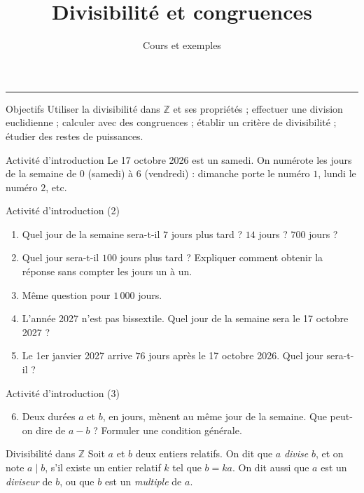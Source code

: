 \documentclass[aspectratio=169,10pt]{beamer}
\title{Divisibilité et congruences}
\subtitle{Cours et exemples}
\date{}
\author{}
\providecommand{\Z}{\mathbb{Z}}
\begin{document}
\begin{frame}[plain]
\vfill
{\inserttitle\par}
\medskip
{\insertsubtitle\par}
\medskip
{\rule{\textwidth}{.5pt}}
\vfill
\end{frame}
\begin{frame}{Objectifs}
Utiliser la divisibilité dans \(\Z\) et ses propriétés ; effectuer une division euclidienne ; calculer avec des congruences ; établir un critère de divisibilité ; étudier des restes de puissances.
\end{frame}
\begin{frame}{Activité d'introduction}
Le 17 octobre 2026 est un samedi. On numérote les jours de la semaine de \(0\) (samedi) à \(6\) (vendredi) : dimanche porte le numéro \(1\), lundi le numéro \(2\), etc.
\end{frame}
\begin{frame}{Activité d'introduction (2)}
\begin{enumerate}
\setcounter{enumi}{0}\item Quel jour de la semaine sera-t-il \(7\) jours plus tard ? \(14\) jours ? \(700\) jours ?

\item Quel jour sera-t-il \(100\) jours plus tard ? Expliquer comment obtenir la réponse sans compter les jours un à un.

\item Même question pour \(1\,000\) jours.

\item L'année 2027 n'est pas bissextile. Quel jour de la semaine sera le 17 octobre 2027 ?

\item Le 1er janvier 2027 arrive \(76\) jours après le 17 octobre 2026. Quel jour sera-t-il ?

\end{enumerate}
\end{frame}
\begin{frame}{Activité d'introduction (3)}
\begin{enumerate}
\setcounter{enumi}{5}\item Deux durées \(a\) et \(b\), en jours, mènent au même jour de la semaine. Que peut-on dire de \(a-b\) ? Formuler une condition générale.

\end{enumerate}
\end{frame}
\begin{frame}{Divisibilité dans \(\Z\)}
Soit \(a\) et \(b\) deux entiers relatifs. On dit que \(a\) \emph{divise} \(b\), et on note \(a\mid b\), s'il existe un entier relatif \(k\) tel que \(b=ka\). On dit aussi que \(a\) est un \emph{diviseur} de \(b\), ou que \(b\) est un \emph{multiple} de \(a\).
\end{frame}
\end{document}
